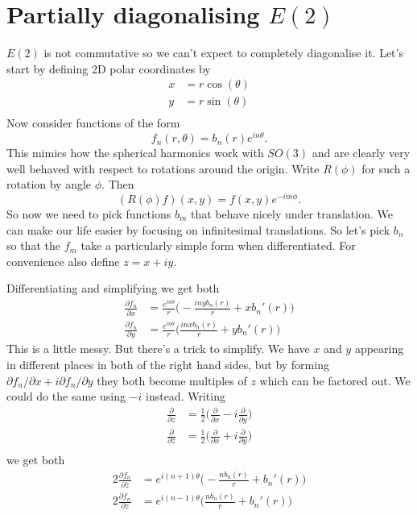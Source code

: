 \documentclass{article}
\begin{document}
\section{Partially diagonalising $E(2)$}
$E(2)$ is not commutative so we can't expect to completely diagonalise it.
Let's start by defining 2D polar coordinates by
\begin{align*}
x & = r\cos(\theta) \\
y & = r\sin(\theta) \\
\end{align*}
Now consider functions of the form
\begin{equation}
f_n(r,\theta)=b_n(r)e^{in\theta}. \label{rot}
\end{equation}
This mimics how the spherical harmonics work with $SO(3)$ and are clearly very well behaved with respect to rotations around the origin.
Write $R(\phi)$ for such a rotation by angle $\phi$.
Then 
\[
(R(\phi)f)(x,y) = f(x,y)e^{-im\phi}.
\]
So now we need to pick functions $b_m$ that behave nicely under translation.
We can make our life easier by focusing on infinitesimal translations.
So let's pick $b_n$ so that the $f_m$ take a particularly simple form when differentiated.
For convenience also define $z=x+iy$.

Differentiating and simplifying we get both
\begin{align}
\frac{\partial f_n}{\partial x} &= 
    \frac{e^{in\theta}}{r}\Big(-\frac{inyb_n(r)}{r}+xb_n'(r)\Big) \label{partialx}\\
\frac{\partial f_n}{\partial y} &= 
    \frac{e^{in\theta}}{r}\Big(\frac{inxb_n(r)}{r}+yb_n'(r)\Big) \label{partialy}
\end{align}
This is a little messy.
But there's a trick to simplify.
We have $x$ and $y$ appearing in different places in both of the right hand sides, but by forming $\partial f_n/\partial x+i\partial f_n/\partial y$ they both become multiples of $z$ which can be factored out.
We could do the same using $-i$ instead.
Writing
\begin{align*}
\frac{\partial}{\partial z} &= \frac{1}{2}\Big(\frac{\partial}{\partial x}-i\frac{\partial}{\partial y}\Big)\\
\frac{\partial}{\partial\bar{z}} &= \frac{1}{2}\Big(\frac{\partial}{\partial x}+i\frac{\partial}{\partial y}\Big)\\
\end{align*}
we get both
\begin{align*}
2\frac{\partial f_n}{\partial\bar{z}} & = e^{i(n+1)\theta}
    \Big(-\frac{nb_n(r)}{r}+b_n'(r)\Big)\\
2\frac{\partial f_n}{\partial z} & = e^{i(n-1)\theta}
    \Big(\frac{nb_n(r)}{r}+b_n'(r)\Big)
\end{align*}
\end{document}
